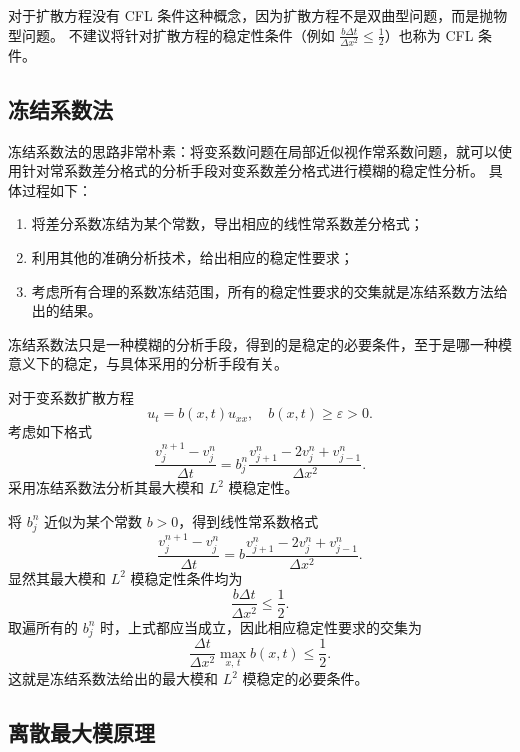 \begin{remark}
    对于扩散方程没有 CFL 条件这种概念，因为扩散方程不是双曲型问题，而是抛物型问题。
    不建议将针对扩散方程的稳定性条件（例如 $\frac{b \Delta t}{\Delta x^2} \le \frac12$）也称为 CFL 条件。
\end{remark}


\subsection{冻结系数法}

冻结系数法的思路非常朴素：将变系数问题在局部近似视作常系数问题，就可以使用针对常系数差分格式的分析手段对变系数差分格式进行模糊的稳定性分析。
具体过程如下：
\begin{enumerate}
    \item 将差分系数冻结为某个常数，导出相应的线性常系数差分格式；
    \item 利用其他的准确分析技术，给出相应的稳定性要求；
    \item 考虑所有合理的系数冻结范围，所有的稳定性要求的交集就是冻结系数方法给出的结果。
\end{enumerate}
冻结系数法只是一种模糊的分析手段，得到的是稳定的必要条件，至于是哪一种模意义下的稳定，与具体采用的分析手段有关。

\begin{example}
    对于变系数扩散方程
    \[
        u_t = b(x,t) u_{xx},\quad b(x,t) \ge \varepsilon > 0.
    \]
    考虑如下格式
    \[
        \frac{v_j^{n+1} - v_j^n}{\Delta t} = b_j^n \frac{v_{j+1}^n - 2v_j^n + v_{j-1}^n}{\Delta x^2}.
    \]
    采用冻结系数法分析其最大模和 $L^2$ 模稳定性。
\end{example}

\begin{solution*}
    将 $b_j^n$ 近似为某个常数 $b > 0$，得到线性常系数格式
    \[
        \frac{v_j^{n+1} - v_j^n}{\Delta t} = b \frac{v_{j+1}^n - 2v_j^n + v_{j-1}^n}{\Delta x^2}.
    \]
    显然其最大模和 $L^2$ 模稳定性条件均为
    \[
        \frac{b \Delta t}{\Delta x^2} \le \frac12.
    \]
    取遍所有的 $b_j^n$ 时，上式都应当成立，因此相应稳定性要求的交集为
    \[
        \frac{\Delta t}{\Delta x^2} \max_{x,\,t} b(x,t) \le \frac12.
    \]
    这就是冻结系数法给出的最大模和 $L^2$ 模稳定的必要条件。
\end{solution*}


\subsection{离散最大模原理}

